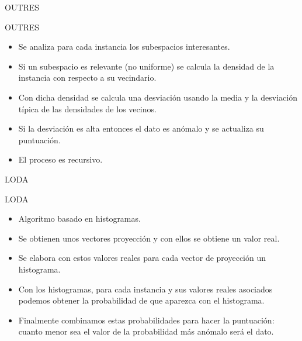 \documentclass[10pt]{beamer}
\begin{document}
\begin{frame}[fragile]{OUTRES}
\vspace{10px}
\pause
{}

\begin{block}{OUTRES}
	\begin{itemize}
		\item Se analiza para cada instancia los subespacios interesantes.
		\pause
		\item Si un subespacio es relevante (no uniforme) se calcula la densidad de la instancia con respecto a su vecindario.
		\pause
		\item Con dicha densidad se calcula una desviación usando la media y la desviación típica de las densidades de los vecinos.
		\pause
		\item Si la desviación es alta entonces el dato es anómalo y se actualiza su puntuación.
		\pause
		\item El proceso es recursivo.
	\end{itemize}
\end{block}

\end{frame}

\begin{frame}[fragile]{LODA}
\vspace{10px}
\pause
{}

\begin{block}{LODA}
	\begin{itemize}
		\item Algoritmo basado en histogramas.
		\pause
		\item Se obtienen unos vectores proyección y con ellos se obtiene un valor real.
		\pause
		\item Se elabora con estos valores reales para cada vector de proyección un histograma.
		\pause
		\item Con los histogramas, para cada instancia y sus valores reales asociados podemos obtener la probabilidad de que aparezca con el histograma.
		\pause
		\item Finalmente combinamos estas probabilidades para hacer la puntuación: cuanto menor sea el valor de la probabilidad más anómalo será el dato.
	\end{itemize}
\end{block}

\end{frame}
\end{document}
